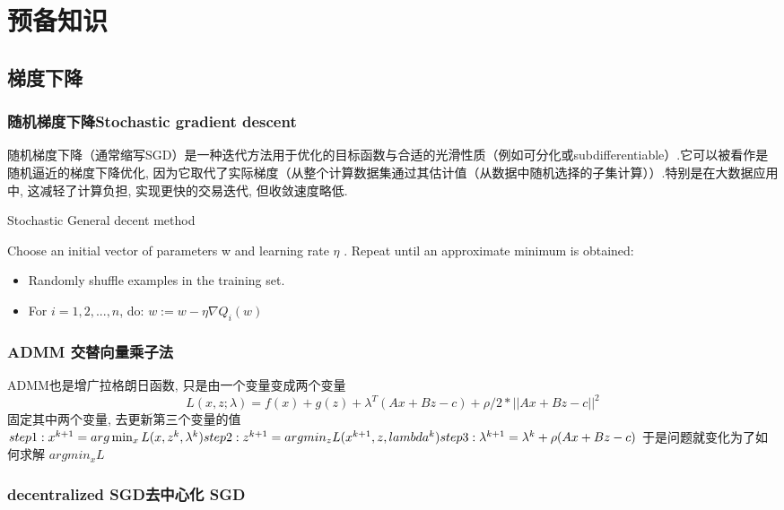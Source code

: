\documentclass[a4paper]{article}
\begin{document}
\section{预备知识}

\subsection{梯度下降}
\subsubsection{随机梯度下降Stochastic gradient descent}
随机梯度下降（通常缩写SGD）是一种迭代方法用于优化的目标函数与合适的光滑性质（例如可分化或subdifferentiable）.它可以被看作是随机逼近的梯度下降优化, 因为它取代了实际梯度（从整个计算数据集通过其估计值（从数据中随机选择的子集计算））.特别是在大数据应用中, 这减轻了计算负担, 实现更快的交易迭代, 但收敛速度略低. 
\begin{algorithm}  
    \caption{ Stochastic  General decent method}  
    \begin{algorithmic}
          
\State Choose an initial vector of parameters  w and learning rate  $\eta$ .
Repeat until an approximate minimum is obtained:
\begin{itemize}
    \item Randomly shuffle examples in the training set.
    \item For $  i=1, 2, ..., n$,  do:
    $w:=w-\eta \nabla Q_{i}(w)$ 
\end{itemize}
    \end{algorithmic}  
   \end{algorithm}  
\subsubsection{ADMM 交替向量乘子法}
ADMM也是增广拉格朗日函数, 只是由一个变量变成两个变量
$$L(x, z;\lambda)= f(x) + g(z) + \lambda ^T(Ax + Bz - c) + \rho/2 * ||Ax + Bz -c ||^2$$
固定其中两个变量, 去更新第三个变量的值
$step1: x^{k+1} = arg \min_x L(x, z^k, \lambda^k) \\
step2: z^{k+1} = arg min_z L(x^{k+1}, z, lambda^k) \\
step3: \lambda ^ {k+1} = \lambda^k + \rho (Ax + Bz - c) \\$
于是问题就变化为了如何求解 $arg min_x L$
\subsubsection{decentralized SGD去中心化 SGD}
\end{document}
